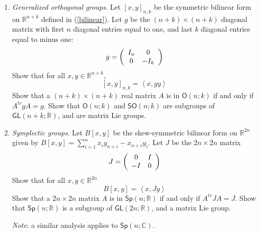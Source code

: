 \documentclass[12pt]{amsbook}
\theoremstyle{plain}
\numberwithin{equation}{chapter}
\numberwithin{theorem}{chapter}
\begin{document}
\begin{enumerate}
\item \label{generalized}\textit{Generalized orthogonal groups}. Let $\left[
x,y\right]  _{n,k}$ be the symmetric bilinear form on $\mathbb{R}^{n+k}$
defined in (\ref{bilinear}). Let $g$ be the $(n+k)\times(n+k)$ diagonal matrix
with first $n$ diagonal entries equal to one, and last $k$ diagonal entries
equal to minus one:
\[
g=\left(
\begin{array}
[c]{cc}%
I_{n} & 0\\
0 & -I_{k}%
\end{array}
\right)
\]
Show that for all $x,y\in\mathbb{R}^{n+k}$,
\[
\left[  x,y\right]  _{n,k}=\left\langle x,gy\right\rangle
\]
Show that a $(n+k)\times(n+k)$ real matrix $A$ is in $\mathsf{O}(n;k)$ if and
only if $A^{tr}gA=g$. Show that $\mathsf{O}(n;k)$ and $\mathsf{SO}(n;k)$ are
subgroups of $\mathsf{GL}(n+k;\mathbb{R})$, and are matrix Lie groups.

\item \label{symplectic}\textit{Symplectic groups}. Let $B\left[  x,y\right]
$ be the skew-symmetric bilinear form on $\mathbb{R}^{2n}$ given by $B\left[
x,y\right]  =\sum_{i=1}^{n}x_{i}y_{n+i}-x_{n+i}y_{i}$. Let $J$ be the
$2n\times2n$ matrix
\[
J=\left(
\begin{array}
[c]{cc}%
0 & I\\
-I & 0
\end{array}
\right)
\]
Show that for all $x,y\in\mathbb{R}^{2n}$%
\[
B\left[  x,y\right]  =\left\langle x,Jy\right\rangle
\]
Show that a $2n\times2n$ matrix $A$ is in $\mathsf{Sp}\left(  n;\mathbb{R}%
\right)  $ if and only if $A^{tr}JA=J$. Show that $\mathsf{Sp}\left(
n;\mathbb{R}\right)  $ is a subgroup of $\mathsf{GL}(2n;\mathbb{R})$, and a
matrix Lie group.

\textit{Note}: a similar analysis applies to $\mathsf{Sp}\left(
n;\mathbb{C}\right)  $.


\end{enumerate}
\end{document}
